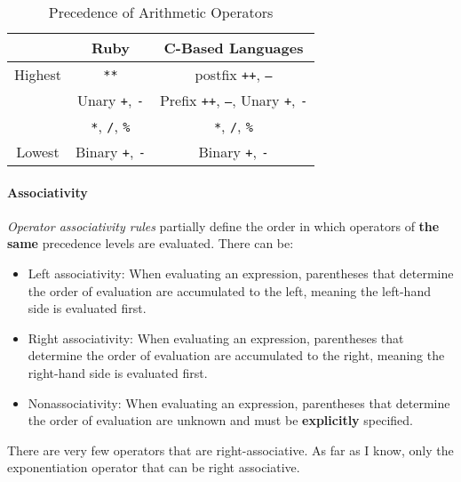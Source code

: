 \begin{table}[h!]
  \centering
  \begin{tabular}{c|cc}
    \toprule
    & Ruby & C-Based Languages \\
    \midrule
    Highest & \texttt{**} & postfix \texttt{++}, \texttt{--} \\
    & Unary \texttt{+}, \texttt{-} & Prefix \texttt{++}, \texttt{--}, Unary \texttt{+}, \texttt{-} \\
    & \texttt{*}, \texttt{/}, \texttt{\%} & \texttt{*}, \texttt{/}, \texttt{\%} \\
    Lowest & Binary \texttt{+}, \texttt{-} & Binary \texttt{+}, \texttt{-} \\
    \bottomrule
  \end{tabular}
  \caption{Precedence of Arithmetic Operators}
  \label{tab:Operator_Evaluation_Order-Precedence}
\end{table}

\paragraph{Associativity}\label{par:Operator_Evaluation_Order-Associativity}
\begin{definition}\label{def:Operator_Associativity_Rules}
  \emph{Operator associativity rules} partially define the order in which operators of \textbf{the same} precedence levels are evaluated.
  There can be:
  \begin{itemize}[noitemsep]
  \item Left associativity: When evaluating an expression, parentheses that determine the order of evaluation are accumulated to the left, meaning the left-hand side is evaluated first.
  \item Right associativity: When evaluating an expression, parentheses that determine the order of evaluation are accumulated to the right, meaning the right-hand side is evaluated first.
  \item Nonassociativity: When evaluating an expression, parentheses that determine the order of evaluation are unknown and must be \textbf{explicitly} specified.
  \end{itemize}

  \begin{remark}
    There are very few operators that are right-associative.
    As far as I know, only the exponentiation operator that can be right associative.
  \end{remark}
\end{definition}

